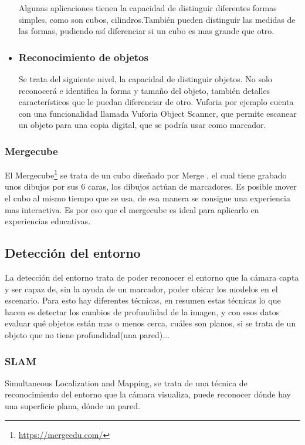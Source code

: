 \begin{itemize}
		Algunas aplicaciones tienen la capacidad de distinguir diferentes formas simples, como son cubos, cilindros.También pueden distinguir las medidas de las formas, pudiendo así diferenciar si un cubo es mas grande que otro.
		\item \subsubsection{Reconocimiento de objetos}
		Se trata del siguiente nivel, la capacidad de distinguir objetos. No solo reconocerá e identifica la forma y tamaño del objeto, también detalles característicos que le puedan diferenciar de otro. Vuforia por ejemplo cuenta con una funcionalidad llamada Vuforia Object Scanner, que permite escanear un objeto para una copia digital, que se podría usar como marcador.
	\end{itemize}
	\subsubsection{Mergecube}
	El Mergecube\footnote{\url{https://mergeedu.com/}} se trata de un cubo diseñado por Merge , el cual tiene grabado unos dibujos por sus 6 caras, los dibujos actúan de marcadores. Es posible mover el cubo al mismo tiempo que se usa, de esa manera se consigue una experiencia mas interactiva. Es por eso que el mergecube es ideal para aplicarlo en experiencias educativas.
	\subsection{Detección del entorno}
	La detección del entorno trata de poder reconocer el entorno que la cámara capta y ser capaz de, sin la ayuda de un marcador, poder ubicar los modelos en el escenario.
	Para esto hay diferentes técnicas, en resumen estas técnicas lo que hacen es detectar los cambios de profundidad de la imagen, y con esos datos evaluar qué objetos están mas o menos cerca, cuáles son planos, si se trata de un objeto que no tiene profundidad(una pared)...
	\subsubsection{SLAM}
	Simultaneous Localization and Mapping, se trata de una técnica de reconocimiento del entorno que la cámara visualiza, puede reconocer dónde hay una superficie plana, dónde un pared.
	
